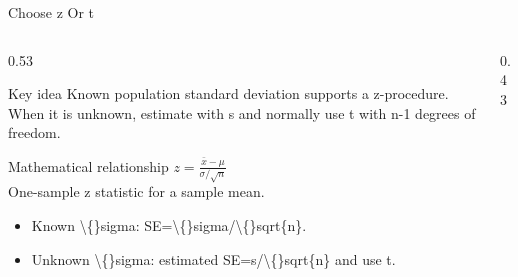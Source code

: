 \documentclass[aspectratio=169]{beamer}
\begin{document}
\begin{frame}{Choose z Or t}
\begin{columns}[T]
\begin{column}{0.53\textwidth}
\begin{alertblock}{Key idea}
\small Known population standard deviation supports a z-procedure. When it is unknown, estimate with s and normally use t with n-1 degrees of freedom.
\end{alertblock}

\begin{block}{Mathematical relationship}
\centering\Large $z=\frac{\bar{x}-\mu}{\sigma/\sqrt{n}}$\\[0.12cm]
\small One-sample z statistic for a sample mean.
\end{block}

\begin{itemize}
\small
\item Known \textbackslash\{\}sigma: SE=\textbackslash\{\}sigma/\textbackslash\{\}sqrt\{n\}.
\item Unknown \textbackslash\{\}sigma: estimated SE=s/\textbackslash\{\}sqrt\{n\} and use t.
\end{itemize}
\end{column}
\begin{column}{0.43\textwidth}
\begin{center}\end{center}
\end{column}
\end{columns}

\end{frame}
\end{document}
